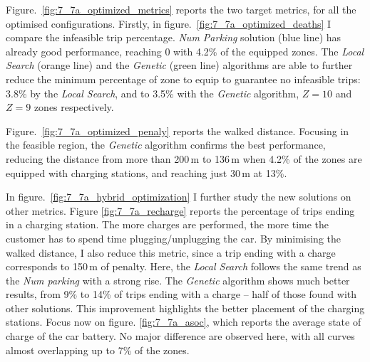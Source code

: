 %
%    
%
%
%
%


Figure.~\ref{fig:7_7a_optimized_metrics} reports the two target metrics, for all the optimised configurations.
Firstly, in figure.~\ref{fig:7_7a_optimized_deaths} I compare the infeasible trip percentage. \textit{Num Parking} solution (blue line) has already good performance, reaching 0 with 4.2\% of the equipped zones. 
The \textit{Local Search} (orange line) and the \textit{Genetic} (green line) algorithms are able to further reduce the minimum percentage of zone to equip to guarantee no infeasible trips: 3.8\% by the \textit{Local Search}, and to 3.5\% with the \textit{Genetic} algorithm, $Z=10$ and $Z=9$ zones respectively.


Figure.~\ref{fig:7_7a_optimized_penaly} reports the walked distance. Focusing in the feasible region, the \textit{Genetic} algorithm confirms the best performance, reducing the distance from more than 200\,m to 136\,m when 4.2\% of the zones are equipped with charging stations, and reaching just 30\,m at 13\%. 


In figure.~\ref{fig:7_7a_hybrid_optimization} I further study the new solutions on other metrics.
Figure \ref{fig:7_7a_recharge} reports the percentage of trips ending in a charging station. The more charges are performed, the more time the customer has to spend time plugging/unplugging the car. By minimising the walked distance, I also reduce this metric, since a trip ending with a charge corresponds to 150\,m of penalty.
Here, the \textit{Local Search} follows the same trend as the \textit{Num parking} with a strong rise. The \textit{Genetic} algorithm shows much better results, from 9\% to 14\% of trips ending with a charge -- half of those found with other solutions. 
This improvement highlights the better placement of the charging stations.
Focus now on figure. \ref{fig:7_7a_asoc}, which reports the average state of charge of the car battery. 
No major difference are observed here, with all curves almost overlapping up to 7\% of the zones.

